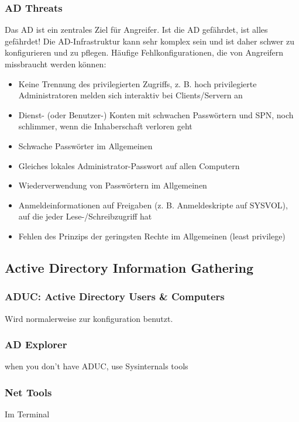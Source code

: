 \subsubsection{AD Threats}
Das AD ist ein zentrales Ziel für Angreifer. Ist die AD gefährdet, ist alles gefährdet! Die AD-Infrastruktur kann sehr komplex sein und ist daher schwer zu konfigurieren und zu pflegen. Häufige Fehlkonfigurationen, die von Angreifern missbraucht werden können:
\begin{itemize}
    \item Keine Trennung des privilegierten Zugriffs, z. B. hoch privilegierte Administratoren melden sich interaktiv bei Clients/Servern an
    \item Dienst- (oder Benutzer-) Konten mit schwachen Passwörtern und SPN, noch schlimmer, wenn die Inhaberschaft verloren geht
    \item Schwache Passwörter im Allgemeinen
    \item Gleiches lokales Administrator-Passwort auf allen Computern
    \item Wiederverwendung von Passwörtern im Allgemeinen
    \item Anmeldeinformationen auf Freigaben (z. B. Anmeldeskripte auf SYSVOL), auf die jeder Lese-/Schreibzugriff hat
    \item Fehlen des Prinzips der geringsten Rechte im Allgemeinen (least privilege)
\end{itemize}

\subsection{Active Directory Information Gathering}\label{subsec:active-directory-information-gathering}

\subsubsection{ADUC: Active Directory Users \& Computers}
Wird normalerweise zur konfiguration benutzt.

\subsubsection{AD Explorer}
when you don’t have ADUC, use Sysinternals tools

\subsubsection{Net Tools}
Im Terminal

